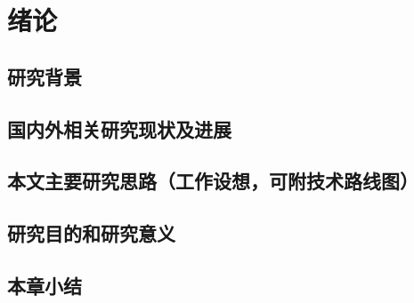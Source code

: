 \section{绪论}

\subsection{研究背景}

\subsection{国内外相关研究现状及进展}

\subsection{本文主要研究思路（工作设想，可附技术路线图）}

\subsection{研究目的和研究意义}

\subsection{本章小结}

\zhlipsum[1-2]

